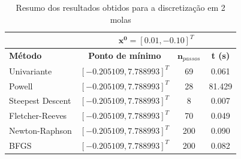 \documentclass[10pt, a4paper]{article}
\begin{document}
\begin{table}[htpb]
  \centering
  \begin{tabular}{|l|c|c|c|}
    \multicolumn{1}{c}{} %
    & 
    \multicolumn{3}{c}{$\mathbf{x^0} = [0.01, -0.10]^T$} \\%
    \hline%
    \textbf{Método}
    &
    \textbf{Ponto de mínimo}
    & 
    $\mathbf{n}_{passos}$
    & 
    \textbf{t (s)}
    \\
    Univariante        & $[-0.205109, 7.788993]^T$ & 69  &  0.061    \\
    Powell             & $[-0.205109, 7.788993]^T$ & 28  & 81.429    \\
    Steepest Descent   & $[-0.205109, 7.788993]^T$ & 8   &  0.007    \\
    Fletcher-Reeves    & $[-0.205109, 7.788993]^T$ & 70  &  0.049    \\
    Newton-Raphson     & $[-0.205109, 7.788993]^T$ & 200 &  0.090    \\
    BFGS               & $[-0.205109, 7.788993]^T$ & 200 &  0.082    \\
    \hline
  \end{tabular}
  \caption{Resumo dos resultados obtidos para a discretização em 2 molas}
  \label{tab:q2a_results}
\end{table}
\end{document}
